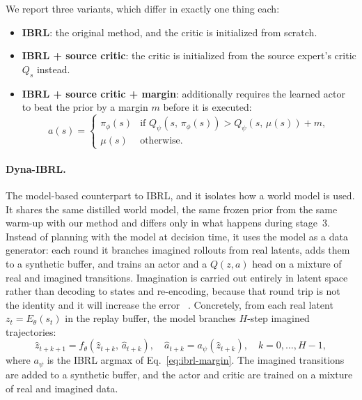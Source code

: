 \documentclass{article} %
\begin{document}
We report three variants, which differ in exactly one thing each:
\begin{itemize}
\item \textbf{IBRL}: the original method, and the critic is initialized from scratch.
\item \textbf{IBRL + source critic}: the critic is initialized from the source expert's critic $Q_s$ instead. 
\item \textbf{IBRL + source critic + margin}: additionally requires the learned actor to beat the prior by a margin $m$ before it is executed: 
\begin{equation}
a(s) = \begin{cases}
\pi_\phi(s) & \text{if } Q_\psi(s,\,\pi_\phi(s)) > Q_\psi(s,\,\mu(s)) + m, \\
\mu(s) & \text{otherwise}.
\end{cases}
\label{eq:ibrl-margin}
\end{equation}
\end{itemize}

\paragraph{Dyna-IBRL.}
The model-based counterpart to IBRL, and it isolates how a world model is used. It shares the same distilled world model, the same frozen prior from the same warm-up with our method and differs only in what happens during stage~3. Instead of planning with the model at decision time, it uses the model as a data generator: each round it branches imagined rollouts from real latents, adds them to a synthetic buffer, and trains an actor and a $Q(z,a)$ head on a mixture of real and imagined transitions. Imagination is carried out entirely in latent space rather than decoding to states and re-encoding, because that round trip is not the identity and it will increase the error ~\citep{hafner2020mastering}. Concretely, from each real latent $z_t = E_\theta(s_t)$ in the replay buffer, the model branches $H$-step imagined trajectories:
\begin{equation}
\hat{z}_{t+k+1} = f_\theta(\hat{z}_{t+k},\, \hat{a}_{t+k}), \quad
\hat{a}_{t+k} = a_\psi(\hat{z}_{t+k}), \quad k = 0, \ldots, H{-}1,
\label{eq:dyna-imagination}
\end{equation}
where $a_\psi$ is the IBRL argmax of Eq.~\ref{eq:ibrl-margin}. The imagined transitions are added to a synthetic buffer, and the actor and critic are trained on a mixture of real and imagined data.
\end{document}
